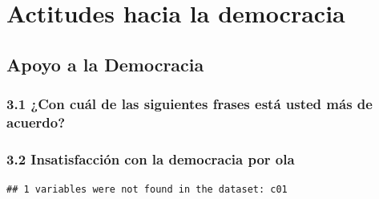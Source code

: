 \documentclass[
  12pt,
  openany]{book}
\begin{document}
\hypertarget{actitudes-hacia-la-democracia}{%
\chapter{Actitudes hacia la democracia}\label{actitudes-hacia-la-democracia}}

\hypertarget{apoyo-a-la-democracia}{%
\section{Apoyo a la Democracia}\label{apoyo-a-la-democracia}}

\hypertarget{con-cuuxe1l-de-las-siguientes-frases-estuxe1-usted-muxe1s-de-acuerdo}{%
\subsection{3.1 ¿Con cuál de las siguientes frases está usted más de acuerdo?}\label{con-cuuxe1l-de-las-siguientes-frases-estuxe1-usted-muxe1s-de-acuerdo}}

\hypertarget{insatisfacciuxf3n-con-la-democracia-por-ola}{%
\subsection{3.2 Insatisfacción con la democracia por ola}\label{insatisfacciuxf3n-con-la-democracia-por-ola}}

\begin{verbatim}
## 1 variables were not found in the dataset: c01
\end{verbatim}
\end{document}
